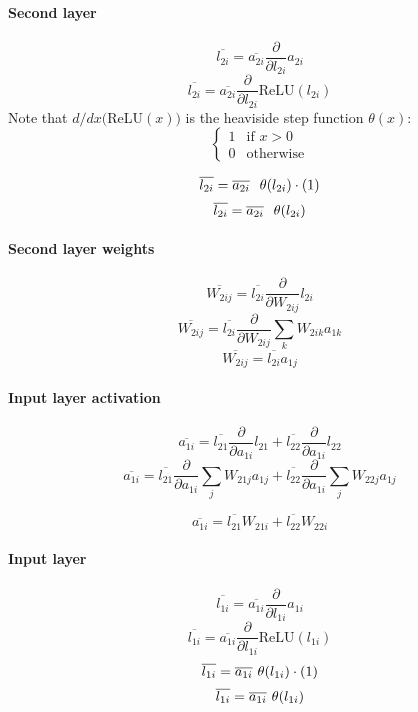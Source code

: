 \documentclass{article}
\begin{document}
\paragraph{Second layer}
\[\overline{l_{2i}} = \overline{a_{2i}} \frac{\partial}{\partial{l_{2i}}} a_{2i} \]
\[\overline{l_{2i}} = \overline{a_{2i}} \frac{\partial}{\partial{l_{2i}}}\text{ReLU}(l_{2i}) \]
Note that $d/dx($ReLU$(x))$ is the heaviside step function $\theta (x)$: 
\[
\begin{cases}
    1 & \text{if } x > 0 \\
    0 & \text{otherwise}
\end{cases}
\]

\[\overline{l_{2i}} = \overline{a_{2i}} \hspace{0.25cm} \theta(l_{2i}) \cdot (1) \]
\begin{equation}
    \overline{l_{2i}} = \overline{a_{2i}} \hspace{0.25cm} \theta(l_{2i}) 
\end{equation} 
\paragraph{Second layer weights}
\[\overline{W_{2ij}} = \overline{l_{2i}} \frac{\partial}{\partial{W_{2ij}}} l_{2i} \]
\[\overline{W_{2ij}} = \overline{l_{2i}} \frac{\partial}{\partial{W_{2ij}}} \sum_{k} W_{2ik}a_{1k} \]
\begin{equation}
    \overline{W_{2ij}} = \overline{l_{2i}} a_{1j}
\end{equation}
\paragraph{Input layer activation}
\[\overline{a_{1i}} = \overline{l_{21}} \frac{\partial}{\partial{a_{1i}}} l_{21} + \overline{l_{22}} \frac{\partial}{\partial{a_{1i}}} l_{22}\]
\[\overline{a_{1i}} = \overline{l_{21}} \frac{\partial}{\partial{a_{1i}}} \sum_{j} W_{21j}a_{1j} + \overline{l_{22}} \frac{\partial}{\partial{a_{1i}}} \sum_{j} W_{22j}a_{1j}\]

\begin{equation}
\overline{a_{1i}} = \overline{l_{21}} W_{21i} + \overline{l_{22}} W_{22i}
\end{equation}
\paragraph{Input layer}
\[\overline{l_{1i}} = \overline{a_{1i}} \frac{\partial}{\partial{l_{1i}}} a_{1i}\]
\[\overline{l_{1i}} = \overline{a_{1i}} \frac{\partial}{\partial{l_{1i}}} \text{ReLU}(l_{1i})\]
\[\overline{l_{1i}} = \overline{a_{1i}} \hspace{0.125cm} \theta(l_{1i}) \cdot (1)\]
\begin{equation}
    \overline{l_{1i}} = \overline{a_{1i}} \hspace{0.125cm} \theta(l_{1i})
\end{equation}
\end{document}

